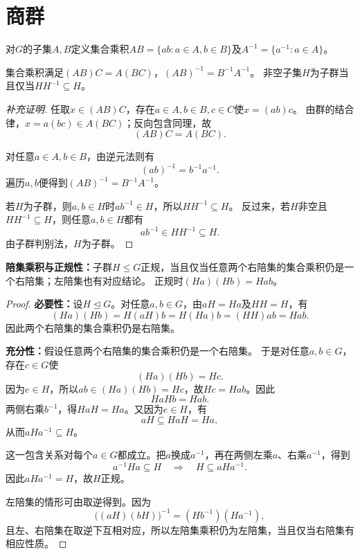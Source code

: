\section{商群}
\begin{definition}
\label{p2:concept:c1-l613}对$G$的子集$A,B$定义集合乘积$AB=\{ab:a\in A,b\in B\}$及$A^{-1}=\{a^{-1}:a\in A\}$。
\end{definition}
\begin{proposition}
集合乘积满足$(AB)C=A(BC)$，$(AB)^{-1}=B^{-1}A^{-1}$。
非空子集$H$为子群当且仅当$HH^{-1}\subseteq H$。
\end{proposition}
\begin{proof}[补充证明]
任取$x\in(AB)C$，存在$a\in A,b\in B,c\in C$使$x=(ab)c$。
由群的结合律，$x=a(bc)\in A(BC)$；反向包含同理，故
\[
(AB)C=A(BC).
\]

对任意$a\in A,b\in B$，由逆元法则有
\[
(ab)^{-1}=b^{-1}a^{-1}.
\]
遍历$a,b$便得到$(AB)^{-1}=B^{-1}A^{-1}$。

若$H$为子群，则$a,b\in H$时$ab^{-1}\in H$，所以$HH^{-1}\subseteq H$。
反过来，若$H$非空且$HH^{-1}\subseteq H$，则任意$a,b\in H$都有
\[
ab^{-1}\in HH^{-1}\subseteq H.
\]
由子群判别法，$H$为子群。
\end{proof}


\begin{theorem}
\textbf{陪集乘积与正规性：}子群$H\leq G$正规，当且仅当任意两个右陪集的集合乘积仍是一个右陪集；左陪集也有对应结论。
正规时$(Ha)(Hb)=Hab$。
\end{theorem}
\begin{proof}
\textbf{必要性：}设$H\trianglelefteq G$。对任意$a,b\in G$，由$aH=Ha$及$HH=H$，有
\[(Ha)(Hb)=H(aH)b=H(Ha)b=(HH)ab=Hab.\]
因此两个右陪集的集合乘积仍是右陪集。

\textbf{充分性：}假设任意两个右陪集的集合乘积仍是一个右陪集。
于是对任意$a,b\in G$，存在$c\in G$使
\[
(Ha)(Hb)=Hc.
\]
因为$e\in H$，所以$ab\in(Ha)(Hb)=Hc$，故$Hc=Hab$。因此
\[
HaHb=Hab.
\]
两侧右乘$b^{-1}$，得$HaH=Ha$。又因为$e\in H$，有
\[
aH\subseteq HaH=Ha,
\]
从而$aHa^{-1}\subseteq H$。

这一包含关系对每个$a\in G$都成立。把$a$换成$a^{-1}$，再在两侧左乘$a$、右乘$a^{-1}$，得到
\[
a^{-1}Ha\subseteq H
\quad\Longrightarrow\quad
H\subseteq aHa^{-1}.
\]
因此$aHa^{-1}=H$，故$H$正规。

左陪集的情形可由取逆得到。因为
\[
\bigl((aH)(bH)\bigr)^{-1}=(Hb^{-1})(Ha^{-1}),
\]
且左、右陪集在取逆下互相对应，所以左陪集乘积仍为左陪集，当且仅当右陪集有相应性质。
\end{proof}

